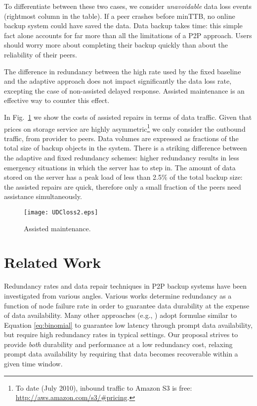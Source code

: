 \documentclass[conference,10pt]{IEEEtran}
\begin{document}
To differentiate between these two cases, we
consider \emph{unavoidable} data loss events (rightmost column in the
table). If a peer crashes before minTTB, no online backup system could
have saved the data. Data backup takes time: this simple fact alone
accounts for far more than all the limitations of a P2P
approach. Users should worry more about completing their backup
quickly than about the reliability of their peers.

The difference in redundancy between the high rate used by the fixed
baseline and the adaptive approach does not impact significantly
the data loss rate, excepting the case of non-assisted delayed
response. Assisted maintenance is an effective way to counter
this effect.



In Fig.~\ref{fig:outsource} we show the costs of assisted repairs in
terms of data traffic. Given that prices on storage service are highly
asymmetric\footnote{To date (July 2010), inbound traffic to Amazon S3
is free: \url{http://aws.amazon.com/s3/#pricing}.} we only consider
the outbound traffic, from provider to peers.  Data volumes are
expressed as fractions of the total size of backup objects in the
system. There is a striking difference between the adaptive and fixed
redundancy schemes: higher redundancy results in less emergency
situations in which the server has to step in.  The amount of data
stored on the server has a peak load of less than 2.5\% of the total
backup size: the assisted repairs are quick, therefore only a small
fraction of the peers need assistance simultaneously.


\begin{figure}
\centering	
	\texttt{[image: UDCloss2.eps]}	
\caption{Assisted maintenance.}
\label{fig:outsource}
\end{figure}



\section{Related Work}
\label{sec:related}

Redundancy rates and data repair techniques in P2P backup systems have
been investigated from various angles. Various
works \cite{Chun06efficientreplica, 1774229} determine redundancy as a
function of node failure rate in order to guarantee data durability at
the expense of data availability. Many other approaches
(e.g., \cite{Kubiatowicz00oceanstore, Sameh03acooperative,
Kiran04totalrecall}) adopt formulae similar to
Equation \ref{eq:binomial} to guarantee low latency through prompt
data availability, but require high redundancy rates in typical
settings. Our proposal strives to provide \emph{both} durability and
performance at a low redundancy cost, relaxing prompt data
availability by requiring that data becomes recoverable within a given
time window.
\end{document}
